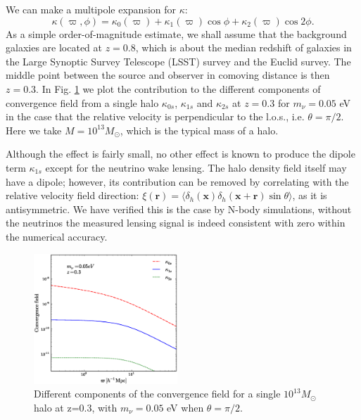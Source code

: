 \documentclass[aps,prl,twocolumn,showpacs,superscriptaddress,groupedaddress,nofootinbib]{revtex4}  %
\begin{document}
We can make a multipole expansion for $\kappa$:
$$\kappa(\varpi,\phi)=\kappa_0(\varpi)+ \kappa_1
(\varpi)\cos\phi+\kappa_2(\varpi)\cos2\phi.$$ 
As a simple order-of-magnitude 
estimate, we shall assume that the background galaxies
are located at $z=0.8$, which is about the median redshift of galaxies
in the Large Synoptic Survey Telescope (LSST) survey\cite{Abell:2009}
and the Euclid survey\cite{Laureijs:2011,Amendola:2012}. The  
middle point between the source and observer in comoving distance 
is then $z=0.3$. In Fig. \ref{fig:kappa} we plot the contribution to the different components
of convergence field from a single halo $\kappa_{0s}$, $\kappa_{1s}$ and 
$\kappa_{2s}$ at $z=0.3$
for $m_\nu=0.05$ eV in the case that the relative velocity is
perpendicular to the l.o.s., i.e. $\theta=\pi/2$.
Here we take $M=10^{13}M_\odot$, which is the typical mass of a halo.

Although the effect is fairly small, no other effect is known to produce the dipole 
term $\kappa_{1s}$  except for the neutrino wake lensing.
The halo density field itself may have a dipole; however, its contribution 
can be removed by correlating with the relative velocity field 
direction: $\xi(\bm r) = \langle \delta_h(\bm x)\delta_h(\bm
  x + \bm r) \sin\theta \rangle$,  as it is antisymmetric.  We have
  verified this is the case by N-body simulations, without the neutrinos
the measured lensing signal is indeed consistent with zero within 
the numerical accuracy.


\begin{figure}[tbp]
  \begin{center}
    \includegraphics[width=0.48\textwidth]{fig_3.eps}
  \end{center}
  \vspace{-0.7cm}
  \caption{\label{fig:kappa} Different components of the convergence
    field for a single $10^{13}  M_\odot$ halo at z=0.3, with $m_\nu=0.05$ eV when
    $\theta=\pi/2$.}
\end{figure}
\end{document}
